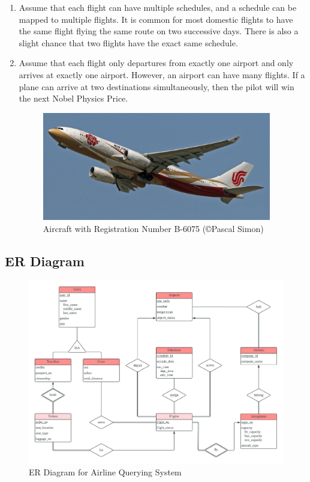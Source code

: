 \documentclass{article}
\begin{document}
\begin{enumerate}
		\item Assume that each flight can have multiple schedules, and a schedule can be mapped to multiple flights. It is common for most domestic flights to have the same flight flying the same route on two successive days. There is also a slight chance that two flights have the exact same schedule.
		
		\item Assume that each flight only departures from exactly one airport and only arrives at exactly one airport. However, an airport can have many flights. If a plane can arrive at two destinations simultaneously, then the pilot will win the next Nobel Physics Price.
		
		\begin{figure}[H]
			\centering
			\includegraphics[width=100mm]{CSDS341_Project_B-6075.jpg}
			\caption{Aircraft with Registration Number B-6075 (\copyright Pascal Simon)}
		\end{figure}
		
	\end{enumerate}
	
	\subsection{ER Diagram}
	
	\begin{figure}[H]
		\centering
		\includegraphics[width=140mm]{CSDS341_Project_ER_Diagram.jpeg}
		\caption{ER Diagram for Airline Querying System}
	\end{figure}
	
\end{document}
